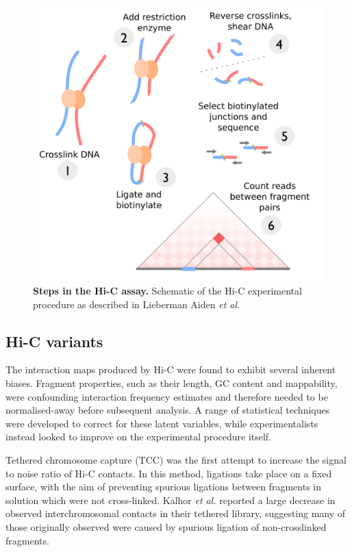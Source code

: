 \documentclass[a4paper,10pt,oneside]{book}
\begin{document}
\begin{figure}
\begin{center}
\includegraphics[width=\textwidth]{figs/hic.png}
\captionsetup{width=\textwidth}
\caption[Steps in the Hi-C assay.]{ {\bf Steps in the Hi-C assay. } 
  Schematic of the Hi-C experimental procedure as described in Lieberman Aiden \emph{et al.}\cite{Lieberman2009}
}\label{fig:hicmethod}
\end{center}
\end{figure} 

\subsection{Hi-C variants}\label{sec:hicvar}

The interaction maps produced by Hi-C were found to exhibit several inherent biases. Fragment properties, such as their length, GC content and mappability, were confounding interaction frequency estimates and therefore needed to be normalised-away before subsequent analysis.\cite{Yaffe2011, Hu2013} A range of statistical techniques were developed to correct for these latent variables,\cite{Imakaev2012, Dekker2013, Hu2012, Li2014} while experimentalists instead looked to improve on the experimental procedure itself.

Tethered chromosome capture (TCC)\cite{Kalhor2012} was the first attempt to increase the signal to noise ratio of Hi-C contacts. In this method, ligations take place on a fixed surface, with the aim of preventing spurious ligations between fragments in solution which were not cross-linked. Kalhor \emph{et al.}\cite{Kalhor2012} reported a large decrease in observed interchromosomal contacts in their tethered library, suggesting many of those originally observed were caused by spurious ligation of non-crosslinked fragments.
\end{document}
